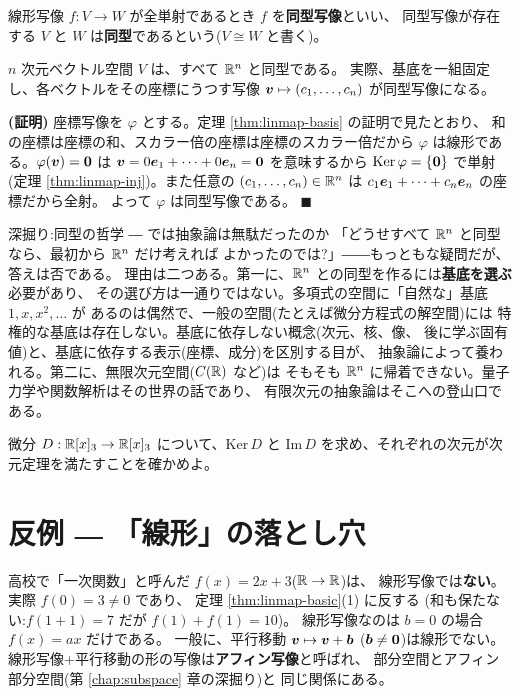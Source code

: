 \begin{teigi}[同型]
線形写像 $f : V \to W$ が全単射であるとき $f$ を\textbf{同型写像}といい、
同型写像が存在する $V$ と $W$ は\textbf{同型}であるという($V \cong W$ と書く)。
\end{teigi}

\begin{teiri}\label{thm:iso-rn}
$n$ 次元ベクトル空間 $V$ は、すべて $\mathbb{R}^n$ と同型である。
実際、基底を一組固定し、各ベクトルをその座標にうつす写像
$\bm{v} \mapsto (c_1, \dots, c_n)$ が同型写像になる。
\end{teiri}

\noindent\textbf{(証明)}\quad
座標写像を $\varphi$ とする。定理 \ref{thm:linmap-basis} の証明で見たとおり、
和の座標は座標の和、スカラー倍の座標は座標のスカラー倍だから
$\varphi$ は線形である。$\varphi(\bm{v}) = \bm{0}$ は
$\bm{v} = 0\bm{e}_1 + \cdots + 0\bm{e}_n = \bm{0}$ を意味するから
$\mathrm{Ker}\,\varphi = \{\bm{0}\}$ で単射
(定理 \ref{thm:linmap-inj})。また任意の $(c_1, \dots, c_n) \in \mathbb{R}^n$ は
$c_1\bm{e}_1 + \cdots + c_n\bm{e}_n$ の座標だから全射。
よって $\varphi$ は同型写像である。 $\blacksquare$

\begin{itembox}[l]{深掘り:同型の哲学 ― では抽象論は無駄だったのか}
「どうせすべて $\mathbb{R}^n$ と同型なら、最初から $\mathbb{R}^n$ だけ考えれば
よかったのでは?」――もっともな疑問だが、答えは否である。
理由は二つある。第一に、$\mathbb{R}^n$ との同型を作るには\textbf{基底を選ぶ}必要があり、
その選び方は一通りではない。多項式の空間に「自然な」基底 $1, x, x^2, \dots$ が
あるのは偶然で、一般の空間(たとえば微分方程式の解空間)には
特権的な基底は存在しない。基底に依存しない概念(次元、核、像、
後に学ぶ固有値)と、基底に依存する表示(座標、成分)を区別する目が、
抽象論によって養われる。第二に、無限次元空間($C(\mathbb{R})$ など)は
そもそも $\mathbb{R}^n$ に帰着できない。量子力学や関数解析はその世界の話であり、
有限次元の抽象論はそこへの登山口である。
\end{itembox}

\begin{mondai}\label{q:linmap}
微分 $D : \mathbb{R}[x]_3 \to \mathbb{R}[x]_3$ について、$\mathrm{Ker}\,D$ と
$\mathrm{Im}\,D$ を求め、それぞれの次元が次元定理を満たすことを確かめよ。
\end{mondai}

\section{反例 ― 「線形」の落とし穴}

\begin{hanrei}[一次関数は線形写像とは限らない]\label{hanrei:linmap-affine}
高校で「一次関数」と呼んだ $f(x) = 2x + 3$($\mathbb{R} \to \mathbb{R}$)は、
線形写像では\textbf{ない}。実際 $f(0) = 3 \neq 0$ であり、
定理 \ref{thm:linmap-basic}(1) に反する
(和も保たない:$f(1 + 1) = 7$ だが $f(1) + f(1) = 10$)。
線形写像なのは $b = 0$ の場合 $f(x) = ax$ だけである。
一般に、平行移動 $\bm{v} \mapsto \bm{v} + \bm{b}$
($\bm{b} \neq \bm{0}$)は線形でない。
線形写像+平行移動の形の写像は\textbf{アフィン写像}と呼ばれ、
部分空間とアフィン部分空間(第 \ref{chap:subspace} 章の深掘り)と
同じ関係にある。
\end{hanrei}

